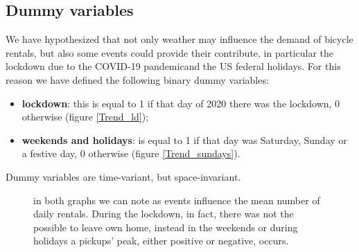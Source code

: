 \subsection{Dummy variables}
We have hypothesized that not only weather may influence the demand of bicycle rentals, but also some events could provide their contribute, in particular the lockdown due to the COVID-\num{19} pandemicand the US federal holidays. For this reason we have defined the following binary dummy variables:
\begin{itemize}
	\item \textbf{lockdown}: this is equal to \num{1} if that day of \num{2020} there was the lockdown, \num{0} otherwise (figure \ref{Trend_ld});
	\item \textbf{weekends and holidays}: is equal to \num{1} if that day was Saturday, Sunday or a festive day, \num{0} otherwise (figure \ref{Trend_sundays}).
\end{itemize}
Dummy variables are time-variant, but space-invariant.

\begin{figure}
	\centering
	\centering
	\quad
	\quad
	\caption{in both graphs we can note as events influence the mean number of daily rentals. During the lockdown, in fact, there was not the possible to leave own home, instead in the weekends or during holidays a pickups' peak, either positive or negative, occurs.}
\end{figure}